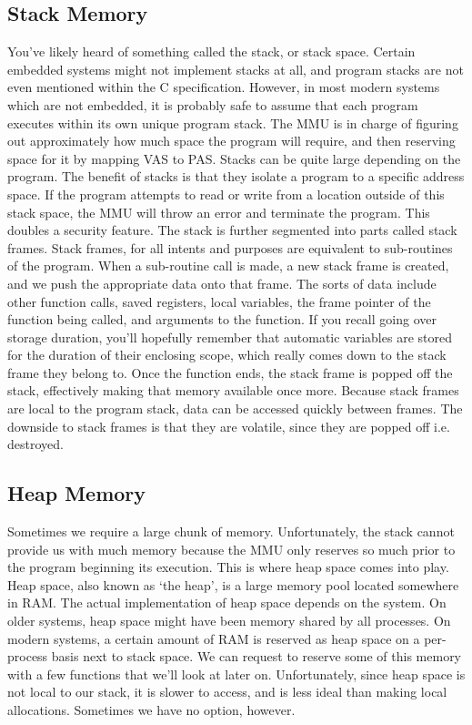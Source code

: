 \documentclass{article}
\begin{document}
\subsection{Stack Memory}

You’ve likely heard of something called the stack, or stack space. Certain embedded systems might not
implement stacks at all, and program stacks are not even mentioned within the C specification. However, in
most modern systems which are not embedded, it is probably safe to assume that each program executes within
its own unique program stack. The MMU is in charge of figuring out approximately how much space the program
will require, and then reserving space for it by mapping VAS to PAS. Stacks can be quite large depending on
the program. The benefit of stacks is that they isolate a program to a specific address space. If the program
attempts to read or write from a location outside of this stack space, the MMU will throw an error and
terminate the program. This doubles a security feature. The stack is further segmented into parts called
stack frames. Stack frames, for all intents and purposes are equivalent to sub-routines of the program. When
a sub-routine call is made, a new stack frame is created, and we push the appropriate data onto that frame.
The sorts of data include other function calls, saved registers, local variables, the frame pointer of the
function being called, and arguments to the function. If you recall going over storage duration, you’ll
hopefully remember that automatic variables are stored for the duration of their enclosing scope, which
really comes down to the stack frame they belong to. Once the function ends, the stack frame is popped off
the stack, effectively making that memory available once more. Because stack frames are local to the program
stack, data can be accessed quickly between frames. The downside to stack frames is that they are volatile,
since they are popped off i.e. destroyed.

\subsection{Heap Memory}

Sometimes we require a large chunk of memory. Unfortunately, the stack cannot provide us with much memory
because the MMU only reserves so much prior to the program beginning its execution. This is where heap space
comes into play. Heap space, also known as ‘the heap’, is a large memory pool located somewhere in RAM. The
actual implementation of heap space depends on the system. On older systems, heap space might have been
memory shared by all processes. On modern systems, a certain amount of RAM is reserved as heap space on a
per-process basis next to stack space. We can request to reserve some of this memory with a few functions
that we’ll look at later on. Unfortunately, since heap space is not local to our stack, it is slower to
access, and is less ideal than making local allocations. Sometimes we have no option, however.
\end{document}
